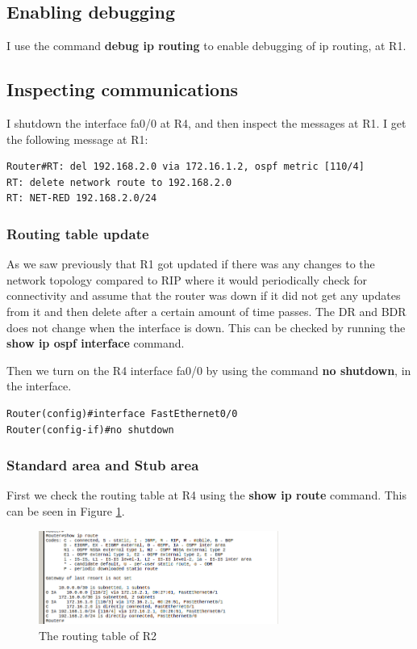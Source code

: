 \documentclass{article}
\begin{document}
\subsection{Enabling debugging}

I use the command \textbf{debug ip routing} to enable debugging of ip routing, at R1.

\subsection{Inspecting communications}

I shutdown the interface fa0/0 at R4, and then inspect the messages at R1.
I get the following message at R1:

\begin{verbatim}
Router#RT: del 192.168.2.0 via 172.16.1.2, ospf metric [110/4]
RT: delete network route to 192.168.2.0
RT: NET-RED 192.168.2.0/24
\end{verbatim}

\subsubsection{Routing table update}

As we saw previously that R1 got updated if there was any changes to the network topology compared to RIP where it would periodically check for connectivity and assume that the router was down if it did not get any updates from it and then delete after a certain amount of time passes.  The DR and BDR does not change when the interface is down. This can be checked by running the \textbf{show ip ospf interface} command. 

Then we turn on the R4 interface fa0/0 by using the command \textbf{no shutdown}, in the interface. 
\begin{verbatim}
Router(config)#interface FastEthernet0/0
Router(config-if)#no shutdown
\end{verbatim}

\subsubsection{Standard area and Stub area}

First we check the routing table at R4 using the \textbf{show ip route} command. This can be seen in Figure \ref{fig:3froute1}.

\begin{figure}[h]
    \centering
    \includegraphics[width=0.7\textwidth]{3froute1}
    \caption{The routing table of R2}
    \label{fig:3froute1}
\end{figure}
\end{document}

